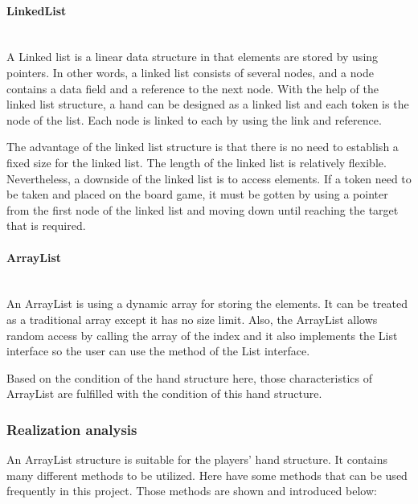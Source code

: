 \paragraph{LinkedList} \mbox{}\\

 A Linked list is a linear data structure in that elements are stored by using pointers. In other words, a linked list consists of several nodes, and a node contains a data field and a reference to the next node. With the help of the linked list structure, a hand can be designed as a linked list and each token is the node of the list. Each node is linked to each by using the link and reference. 

The advantage of the linked list structure is that there is no need to establish a fixed size for the linked list. The length of the linked list is relatively flexible. Nevertheless, a downside of the linked list is to access elements. If a token need to be taken and placed on the board game, it must be gotten by using a pointer from the first node of the linked list and moving down until reaching the target that is required.

\paragraph{ArrayList} \mbox{}\\

An ArrayList is using a dynamic array for storing the elements. It can be treated as a traditional array except it has no size limit. Also, the ArrayList allows random access by calling the array of the index and it also implements the List interface so the user can use the method of the List interface.

Based on the condition of the hand structure here,  those characteristics of ArrayList are fulfilled with the condition of this hand structure.    


\subsubsection{Realization analysis}
An ArrayList structure is suitable for the players' hand structure. It contains many different methods to be utilized. Here have some methods that can be used frequently in this project.
Those methods are shown and introduced below: 

